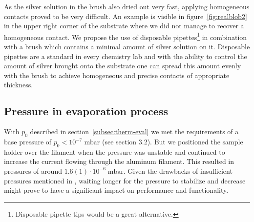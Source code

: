 \documentclass[a4paper,10pt,twocolumn]{article}
\begin{document}
\begin{extract*}
As the silver solution in the brush also dried out very fast, applying homogeneous contacts proved to be very difficult. An example is visible in figure~\ref{fig:realblob2} in the upper right corner of the substrate where we did not manage to recover a homogeneous contact.\mypar
We propose the use of disposable pipettes\footnote{Disposable pipette tips would be a great alternative.} in combination with a brush which contains a minimal amount of silver solution on it. Disposable pipettes are a standard in every chemistry lab and with the ability to control the amount of silver brought onto the substrate one can spread this amount evenly with the brush to achieve homogeneous and precise contacts of appropriate thickness.

\subsection{Pressure in evaporation process}

With $p_0$ described in section~\ref{subsec:therm-eval} we met the requirements of a base pressure of $p_0<10^{-7}\;\text{mbar}$ (see \cite{labdesc} section 3.2). But we positioned the sample holder over the filament when the pressure was unstable and continued to increase the current flowing through the aluminum filament. This resulted in pressures of around $1.6(1)\cdot10^{-6}\;\text{mbar}$.\mypar
Given the drawbacks of insufficient pressures mentioned in \cite{labdesc}, waiting longer for the pressure to stabilize and decrease might prove to have a significant impact on performance and functionality.





\end{extract*}
\end{document}
